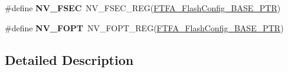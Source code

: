 \begin{DoxyCompactItemize}
\item 
\mbox{\label{group___n_v___register___accessor___macros_ga6bdca22aa1e76ebd389ecf4a5d70b93c}} 
\#define {\bfseries N\+V\+\_\+\+F\+S\+EC}~N\+V\+\_\+\+F\+S\+E\+C\+\_\+\+R\+EG(\hyperlink{group___n_v___peripheral_ga3458652dfc38239f92682556e63596b5}{F\+T\+F\+A\+\_\+\+Flash\+Config\+\_\+\+B\+A\+S\+E\+\_\+\+P\+TR})
\item 
\mbox{\label{group___n_v___register___accessor___macros_gad508c386413905d31c12a2319fa355e3}} 
\#define {\bfseries N\+V\+\_\+\+F\+O\+PT}~N\+V\+\_\+\+F\+O\+P\+T\+\_\+\+R\+EG(\hyperlink{group___n_v___peripheral_ga3458652dfc38239f92682556e63596b5}{F\+T\+F\+A\+\_\+\+Flash\+Config\+\_\+\+B\+A\+S\+E\+\_\+\+P\+TR})
\end{DoxyCompactItemize}


\subsection{Detailed Description}

